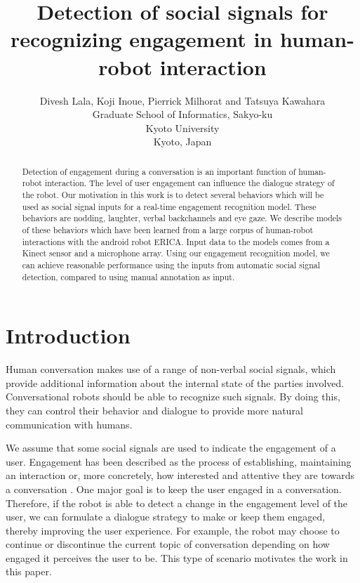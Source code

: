 \documentclass[letterpaper]{article} %
\begin{document}
\title{Detection of social signals for recognizing engagement in human-robot interaction}
\author{Divesh Lala, Koji Inoue, Pierrick Milhorat and Tatsuya Kawahara\\
Graduate School of Informatics, Sakyo-ku\\
Kyoto University\\
Kyoto, Japan\\
}
\maketitle
\begin{abstract}
Detection of engagement during a conversation is an important function of human-robot interaction. The level of user engagement can influence the dialogue strategy of the robot. Our motivation in this work is to detect several behaviors which will be used as social signal inputs for a real-time engagement recognition model. These behaviors are nodding, laughter, verbal backchannels and eye gaze. We describe models of these behaviors which have been learned from a large corpus of human-robot interactions with the android robot ERICA. Input data to the models comes from a Kinect sensor and a microphone array. Using our engagement recognition model, we can achieve reasonable performance using the inputs from automatic social signal detection, compared to using manual annotation as input.
\end{abstract}

\section{Introduction}
Human conversation makes use of a range of non-verbal social signals, which provide additional information about the internal state of the parties involved. Conversational robots should be able to recognize such signals. By doing this, they can control their behavior and dialogue to provide more natural communication with humans.

We assume that some social signals are used to indicate the engagement of a user. Engagement has been described as the process of establishing, maintaining an interaction \cite{Sidner2005} or, more concretely, how interested and attentive they are towards a conversation \cite{Yu2004}. One major goal is to keep the user engaged in a conversation. Therefore, if the robot is able to detect a change in the engagement level of the user, we can formulate a dialogue strategy to make or keep them engaged, thereby improving the user experience. For example, the robot may choose to continue or discontinue the current topic of conversation depending on how engaged it perceives the user to be. This type of scenario motivates the work in this paper.
\end{document}
